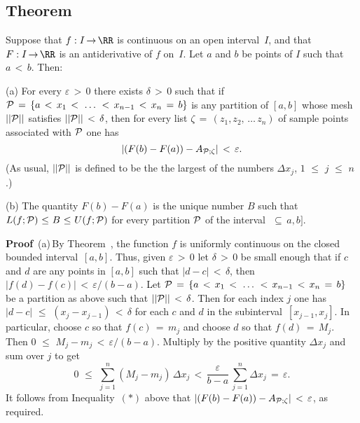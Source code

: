 {\VV

             \subsection{\small{\bf Theorem}}
             \label{TheoremE45.130}

\V

        Suppose that $f:I \,{\rightarrow}\, {\RR}$ is continuous on an open interval~$I$,
    and that $F:I \,{\rightarrow}\, {\RR}$ is an antiderivative of $f$ on~$I$. Let $a$ and $b$ be points of $I$ such that $a\,<\,b$. Then:

\V

        (a) For every ${\varepsilon}\,>\,0$ there exists ${\delta}\,>\,0$ such that if
    ${\cal P} \,=\, \{a\,<\,x_{1}\,<\,\,{\ldots}\,\,<\,x_{n-1}\,<\,x_{n} \,=\, b\}$ is any partition of $[a,b]$ whose mesh $||{\cal P}||$
    satisfies $||{\cal P}||\,<\,{\delta}$, then for every list ${\zeta} \,=\, (z_{1}, z_{2},\,{\ldots}\,z_{n})$ of sample points associated with ${\cal P}$
    one has
        \begin{displaymath}
        \left|(F(b)-F(a)) - A_{{\cal P};{\zeta}}\right|\,<\,{\varepsilon}.
        \end{displaymath}
    (As usual, $||{\cal P}||$ is defined to be the the largest of the numbers ${\Delta}x_{j}$, $1\,\,{\leq}\,\,j\,\,{\leq}\,\,n$.)

\V

        (b) The quantity $F(b) - F(a)$ is the unique number $B$ such that $L(f;{\cal P})\,\,{\leq}\,\,B\,\,{\leq}\,\,U(f;{\cal P})$
    for every partition ${\cal P}$ of the interval~$ \,{\subseteq}\, a,b]$.

\V

        {\bf Proof}\, (a)\,By Theorem~, the function $f$ is uniformly continuous on the closed bounded interval~$[a,b]$.
    Thus, given ${\varepsilon}\,>\,0$ let ${\delta}\,>\,0$ be small enough that if $c$ and $d$
    are any points in $[a,b]$ such that $|d-c|\,<\,{\delta}$, then $|f(d)-f(c)|\,<\,{\varepsilon}/(b-a)$.
    Let ${\cal P} \,=\, \{a\,<\,x_{1}\,<\,\,{\ldots}\,\,<\,x_{n-1}\,<\,x_{n} \,=\, b\}$ be a partition as above such that $||{\cal P}||\,<\,{\delta}$.
    Then for each index $j$ one has $|d-c|\,\,{\leq}\,\,(x_{j}-x_{j-1})\,<\,{\delta}$ for each $c$ and $d$ in the subinterval~$[x_{j-1},x_{j}]$.
    In particular, choose $c$ so that $f(c) \,=\, m_{j}$ and choose $d$ so that $f(d) \,=\, M_{j}$. Then $0\,\,{\leq}\,\,M_{j} - m_{j}\,<\,{\varepsilon}/(b-a)$.
    Multiply by the positive quantity ${\Delta}x_{j}$ and sum over $j$ to get
        \begin{displaymath}
        0\,\,{\leq}\,\,\sum_{j=1}^{n} (M_{j}-m_{j})\,{\Delta}x_{j}\,<\,\frac{{\varepsilon}}{b-a}\,\sum_{j=1}^{n} {\Delta}x_{j} \,=\, {\varepsilon}. 
        \end{displaymath}
    It follows from Inequality~$({\ast})$ above that $|(F(b)-F(a)) - A_{{\cal P}; {\zeta}}|\,<\,{\varepsilon}$, as required.

}
